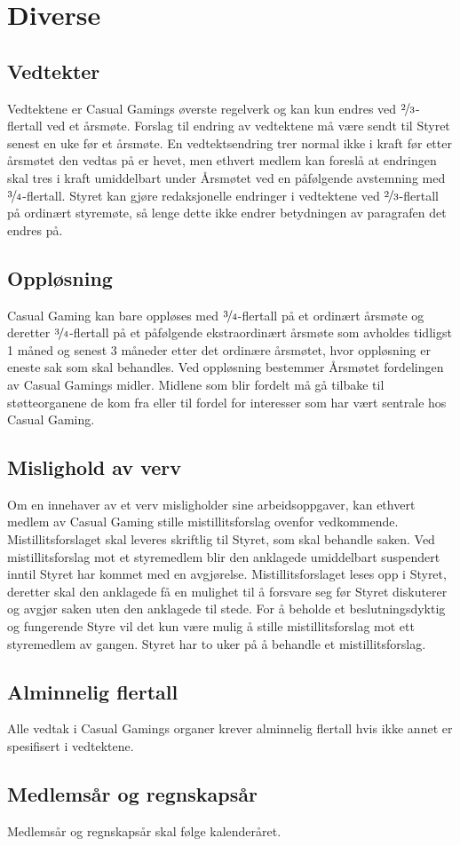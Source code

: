 \chapter{Diverse}

\section{Vedtekter}
Vedtektene er Casual Gamings øverste regelverk og kan kun endres ved $\nicefrac{2}{3}$-flertall ved et årsmøte. Forslag til endring av vedtektene må være sendt til Styret senest en uke før et årsmøte. En vedtektsendring trer normal ikke i kraft før etter årsmøtet den vedtas på er hevet, men ethvert medlem kan foreslå at endringen skal tres i kraft umiddelbart under Årsmøtet ved en påfølgende avstemning med $\nicefrac{3}{4}$-flertall. Styret kan gjøre redaksjonelle endringer i vedtektene ved $\nicefrac{2}{3}$-flertall på ordinært styremøte, så lenge dette ikke endrer betydningen av paragrafen det endres på.

\section{Oppløsning}
Casual Gaming kan bare oppløses med $\nicefrac{3}{4}$-flertall på et ordinært årsmøte og deretter $\nicefrac{3}{4}$-flertall på et påfølgende ekstraordinært årsmøte som avholdes tidligst 1 måned og senest 3 måneder etter det ordinære årsmøtet, hvor oppløsning er eneste sak som skal behandles. Ved oppløsning bestemmer Årsmøtet fordelingen av Casual Gamings midler. Midlene som blir fordelt må gå tilbake til støtteorganene de kom fra eller til fordel for interesser som har vært sentrale hos Casual Gaming.

\section{Mislighold av verv}
Om en innehaver av et verv misligholder sine arbeidsoppgaver, kan ethvert medlem av Casual Gaming stille mistillitsforslag ovenfor vedkommende. Mistillitsforslaget skal leveres skriftlig til Styret, som skal behandle saken. Ved mistillitsforslag mot et styremedlem blir den anklagede umiddelbart suspendert inntil Styret har kommet med en avgjørelse. Mistillitsforslaget leses opp i Styret, deretter skal den anklagede få en mulighet til å forsvare seg før Styret diskuterer og avgjør saken uten den anklagede til stede. For å beholde et beslutningsdyktig og fungerende Styre vil det kun være mulig å stille mistillitsforslag mot ett styremedlem av gangen. Styret har to uker på å behandle et mistillitsforslag.

\section{Alminnelig flertall}
Alle vedtak i Casual Gamings organer krever alminnelig flertall hvis ikke annet er spesifisert i vedtektene.

\section{Medlemsår og regnskapsår}
Medlemsår og regnskapsår skal følge kalenderåret.
